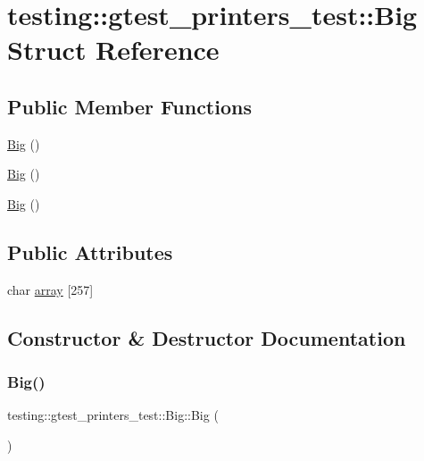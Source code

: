 \hypertarget{structtesting_1_1gtest__printers__test_1_1_big}{}\section{testing\+::gtest\+\_\+printers\+\_\+test\+::Big Struct Reference}
\label{structtesting_1_1gtest__printers__test_1_1_big}
\subsection*{Public Member Functions}
\begin{DoxyCompactItemize}
\item 
\mbox{\hyperlink{structtesting_1_1gtest__printers__test_1_1_big_adb57fb0e14adb81177e3bfd7ed39966c}{Big}} ()
\item 
\mbox{\hyperlink{structtesting_1_1gtest__printers__test_1_1_big_adb57fb0e14adb81177e3bfd7ed39966c}{Big}} ()
\item 
\mbox{\hyperlink{structtesting_1_1gtest__printers__test_1_1_big_adb57fb0e14adb81177e3bfd7ed39966c}{Big}} ()
\end{DoxyCompactItemize}
\subsection*{Public Attributes}
\begin{DoxyCompactItemize}
\item 
char \mbox{\hyperlink{structtesting_1_1gtest__printers__test_1_1_big_a401553b402fffda204a3dfaf2ed086d8}{array}} \mbox{[}257\mbox{]}
\end{DoxyCompactItemize}


\subsection{Constructor \& Destructor Documentation}
\mbox{\label{structtesting_1_1gtest__printers__test_1_1_big_adb57fb0e14adb81177e3bfd7ed39966c}} 
\subsubsection{\texorpdfstring{Big()}{Big()}\hspace{0.1cm}{\footnotesize\ttfamily [1/3]}}
{\footnotesize\ttfamily testing\+::gtest\+\_\+printers\+\_\+test\+::\+Big\+::\+Big (\begin{DoxyParamCaption}{ }\end{DoxyParamCaption})\hspace{0.3cm}{\ttfamily [inline]}}

